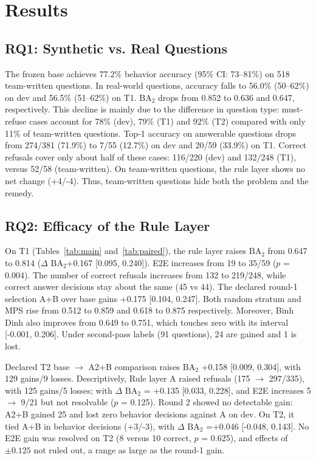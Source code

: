 \documentclass[runningheads]{llncs}
\newcommand{\BA}{\ensuremath{\mathrm{BA}_2}}
\begin{document}
\section{Results}\label{sec:results}

\subsection{RQ1: Synthetic vs. Real Questions}

{The frozen base achieves 77.2\% behavior accuracy (95\% CI: 73--81\%) on 518 team-written questions. In real-world questions, accuracy falls to 56.0\% (50--62\%) on dev and 56.5\% (51--62\%) on T1. \BA{} drops from 0.852 to 0.636 and 0.647, respectively. This decline is mainly due to the difference in question type: must-refuse cases account for 78\% (dev), 79\% (T1) and 92\% (T2) compared with only 11\% of team-written questions. Top-1 accuracy on answerable questions drops from 274/381 (71.9\%) to 7/55 (12.7\%) on dev and 20/59 (33.9\%) on T1. Correct refusals cover only about half of these cases: 116/220 (dev) and 132/248 (T1), versus 52/58 (team-written). On team-written questions, the rule layer shows no net change (+4/-4). Thus, team-written questions hide both the problem and the remedy.}

\subsection{RQ2: Efficacy of the Rule Layer}

{On T1 (Tables~\ref{tab:main} and~\ref{tab:paired}), the rule layer raises \BA{} from 0.647 to 0.814 ($\Delta$ \BA +0.167 [0.095, 0.240]). E2E increases from 19 to 35/59 ($p$ = 0.004). The number of correct refusals increases from 132 to 219/248, while correct answer decisions stay about the same (45 vs 44). The declared round-1 selection A+B over base gains +0.175 [0.104, 0.247]. Both random stratum and MPS rise from 0.512 to 0.859 and 0.618 to 0.875 respectively. Moreover, Binh Dinh also improves from 0.649 to 0.751, which touches zero with its interval [-0.001, 0.206]. Under second-pass labels (91 questions), 24 are gained and 1 is lost.}

{Declared T2 base $\rightarrow$ A2+B comparison raises \BA{} +0.158 [0.009, 0.304], with 129 gains/9 losses. Descriptively, Rule layer A raised refusals (175 $\rightarrow$ 297/335), with 125 gains/5 losses; with $\Delta$ \BA{} = +0.135 [0.033, 0.228], and E2E increases 5 $\rightarrow$ 9/21 but not resolvable ($p$ = 0.125). Round 2 showed no detectable gain: A2+B gained 25 and lost zero behavior decisions against A on dev. On T2, it tied A+B in behavior decisions (+3/-3), with $\Delta$ \BA{} =+0.046 [-0.048, 0.143]. No E2E gain was resolved on T2 (8 versus 10 correct, $p$ = 0.625), and effects of $\pm0.125$ not ruled out, a range as large as the round-1 gain.}
\end{document}
